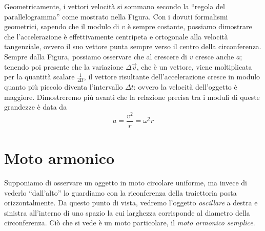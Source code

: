 Geometricamente, i vettori velocità si sommano secondo la ``regola del parallelogramma''
come mostrato nella Figura. Con i dovuti formalismi geometrici, sapendo che il
modulo di $v$ è sempre costante, possiamo dimostrare che l'accelerazione è
effettivamente centripeta e ortogonale alla velocità tangenziale, ovvero il
suo vettore punta sempre verso il centro della circonferenza. Sempre dalla Figura,
possiamo osservare che al crescere di $v$ cresce anche $a$; tenendo poi
presente che la variazione $\Delta \overrightarrow{v}$, che è un vettore,
viene moltiplicata per la quantità scalare $\frac{1}{\Delta t}$, il vettore
risultante dell'accelerazione cresce in modulo quanto più piccolo diventa
l'intervallo $\Delta t$: ovvero la velocità dell'oggetto è maggiore.
Dimostreremo più
avanti che la relazione precisa tra i moduli di queste grandezze è data da
\[ a = \frac{v^2}{r} = \omega^2 r \]

\section{Moto armonico}
Supponiamo di osservare un oggetto in moto circolare uniforme, ma invece di
vederlo ``dall'alto'' lo guardiamo con la riconferenza della traiettoria
posta orizzontalmente. Da questo punto di vista, vedremo l'oggetto \textit{oscillare}
a destra e sinistra all'interno di uno spazio la cui larghezza corrisponde al
diametro della circonferenza. Ciò che si vede è un moto particolare, il
\textit{moto armonico semplice}.

